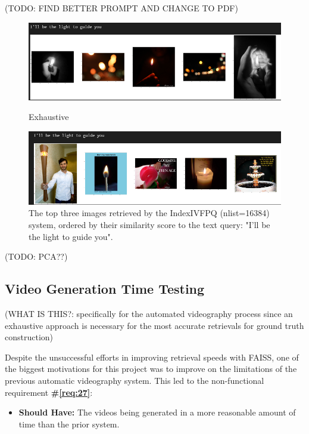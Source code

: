 \documentclass{l4proj}
\begin{document}
(TODO: FIND BETTER PROMPT AND CHANGE TO PDF)
\begin{figure}[H]
    \centering
    \includegraphics[width=1\textwidth]{figures/exhaustive_retrievals.png}
    \caption{Exhaustive}
    \includegraphics[width=1\textwidth]{figures/faiss_retrievals.png}
    \caption{The top three images retrieved by the IndexIVFPQ (nlist=16384) system, ordered by their similarity score to the text query: "I'll be the light to guide you".}
    \label{fig:faiss_retrievals}
\end{figure}

(TODO: PCA??)

\subsection{Video Generation Time Testing}
(WHAT IS THIS?: specifically for the automated videography process since an exhaustive approach is necessary for the most accurate retrievals for ground truth construction)

Despite the unsuccessful efforts in improving retrieval speeds with FAISS, one of the biggest motivations for this project was to improve on the limitations of the previous automatic videography system. This led to the non-functional requirement \textbf{\#\ref{req:27}}:

\begin{itemize}
    \item \textbf{Should Have:} The videos being generated in a more reasonable amount of time than the prior system.
\end{itemize}
\end{document}
